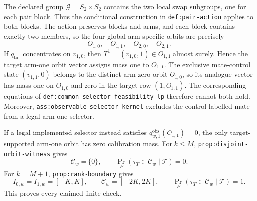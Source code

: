 The declared group \(\mathcal G=S_2\times S_2\) contains the two local swap subgroups, one for each pair block. Thus the conditional construction in \texttt{def:pair-action} applies to both blocks. The action preserves blocks and arms, and each block contains exactly two members, so the four global arm-specific orbits are precisely
\[
O_{1,0},\quad O_{1,1},\quad O_{2,0},\quad O_{2,1}.
\tag{1}
\]
If \(q_{\mathrm{tar}}\) concentrates on \(v_{1,0}\), then \(T^1=(v_{1,0},1)\in O_{1,1}\) almost surely. Hence the target arm-one orbit vector assigns mass one to \(O_{1,1}\). The exclusive mate-control state \((v_{1,1},0)\) belongs to the distinct arm-zero orbit \(O_{1,0}\), so its analogue vector has mass one on \(O_{1,0}\) and zero in the target row \((1,O_{1,1})\). The corresponding equations of \texttt{def:common-selector-feasibility-lp} therefore cannot both hold. Moreover, \texttt{ass:observable-selector-kernel} excludes the control-labelled mate from a legal arm-one selector.

If a legal implemented selector instead satisfies \(q^{\mathrm{obs}}_{w,1}(O_{1,1})=0\), the only target-supported arm-one orbit has zero calibration mass. For \(k\le M\), \texttt{prop:disjoint-orbit-witness} gives
\[
\mathcal C_w=\{0\},\qquad \Pr_P(\tau_T\in\mathcal C_w\mid\mathcal T)=0.
\tag{2}
\]
For \(k=M+1\), \texttt{prop:rank-boundary} gives
\[
I_{0,w}=I_{1,w}=[-K,K],\qquad \mathcal C_w=[-2K,2K],\qquad \Pr_P(\tau_T\in\mathcal C_w\mid\mathcal T)=1.
\tag{3}
\]
This proves every claimed finite check.